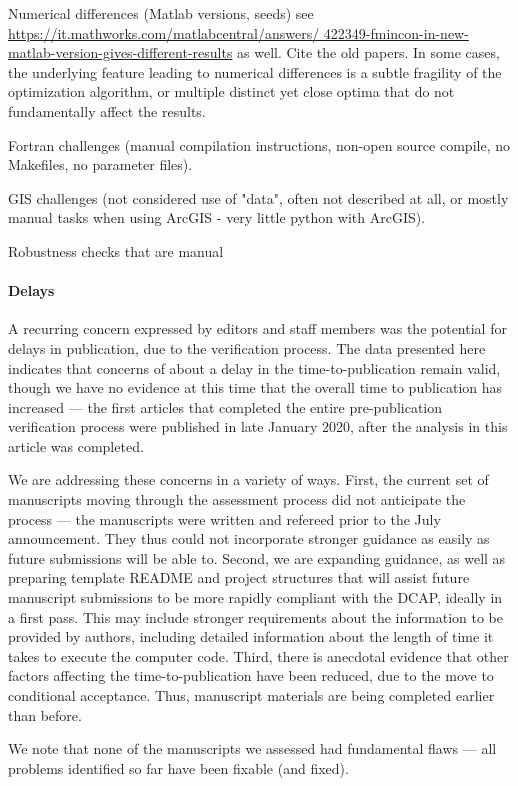 \documentclass[PP]{AEA}
\begin{document}
Numerical differences (Matlab versions, seeds) see \url{https://it.mathworks.com/matlabcentral/answers/
422349-fmincon-in-new-matlab-version-gives-different-results} as well. Cite the old papers. In some cases, the underlying feature leading to numerical differences is a subtle fragility of the optimization algorithm, or multiple distinct yet close optima that do not fundamentally affect the results.

Fortran challenges (manual compilation instructions, non-open source compile, no Makefiles, no parameter files).

GIS challenges (not considered use of "data", often not described at all, or mostly manual tasks when using ArcGIS - very little python with ArcGIS). 

Robustness checks that are manual

\paragraph{Delays} A recurring concern expressed by editors and staff members was the potential for   delays in publication, due to the verification process. The data presented here indicates that concerns of about a delay in the time-to-publication remain valid, though we have no evidence at this time that the overall time to publication has increased --- the first articles that completed the entire pre-publication verification process were published in late January 2020, after the analysis in this article was completed.

We are addressing these concerns in a variety of ways. First, the current set of manuscripts moving through the assessment process did not anticipate the process --- the manuscripts were written and refereed prior to the July announcement. They thus could not incorporate stronger guidance as easily as future submissions will be able to. Second, we are expanding guidance, as well as preparing template README and project structures that will assist future manuscript submissions to be more rapidly compliant with the \ac{DCAP}, ideally in a first pass. This may include stronger requirements about the information to be provided by authors, including detailed information about the length of time it takes to execute the computer code.
Third, there is anecdotal evidence that other factors affecting the time-to-publication have been reduced, due to the move to conditional acceptance. Thus, manuscript materials are being completed earlier than before. 

We note that none of the \jiramcs{} manuscripts we assessed had  fundamental flaws --- all problems identified so far have been fixable (and fixed). 
\end{document}
